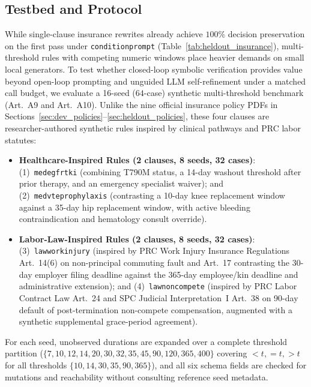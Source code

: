 \documentclass[10pt,twocolumn]{article}
\renewcommand{\_}{\textunderscore\allowbreak}
\begin{document}
\subsection{Testbed and Protocol}
While single-clause insurance rewrites already achieve $100\%$ decision preservation on the first pass under \texttt{condition\_prompt} (Table~\ref{tab:heldout_insurance}), multi-threshold rules with competing numeric windows place heavier demands on small local generators. To test whether closed-loop symbolic verification provides value beyond open-loop prompting and unguided LLM self-refinement under a matched call budget, we evaluate a 16-seed ($64$-case) synthetic multi-threshold benchmark (Art.~A9 and Art.~A10). Unlike the nine official insurance policy PDFs in Sections~\ref{sec:dev_policies}--\ref{sec:heldout_policies}, these four clauses are researcher-authored synthetic rules inspired by clinical pathways and PRC labor statutes:
\begin{itemize}[leftmargin=*,nosep]
  \item \textbf{Healthcare-Inspired Rules (2 clauses, 8 seeds, 32 cases)}: (1)~\texttt{med\_egfr\_tki} (combining T790M status, a 14-day washout threshold after prior therapy, and an emergency specialist waiver); and (2)~\texttt{med\_vte\_prophylaxis} (contrasting a 10-day knee replacement window against a 35-day hip replacement window, with active bleeding contraindication and hematology consult override).
  \item \textbf{Labor-Law-Inspired Rules (2 clauses, 8 seeds, 32 cases)}: (3)~\texttt{law\_work\_injury} (inspired by PRC Work Injury Insurance Regulations Art.~14(6) on non-principal commuting fault and Art.~17 contrasting the 30-day employer filing deadline against the 365-day employee/kin deadline and administrative extension); and (4)~\texttt{law\_noncompete} (inspired by PRC Labor Contract Law Art.~24 and SPC Judicial Interpretation~I Art.~38 on 90-day default of post-termination non-compete compensation, augmented with a synthetic supplemental grace-period agreement).
\end{itemize}

For each seed, unobserved durations are expanded over a complete threshold partition ($\{7, 10, 12, 14, 20, 30, 32, 35, 45, 90, 120, 365, 400\}$ covering $< t, = t, > t$ for all thresholds $\{10, 14, 30, 35, 90, 365\}$), and all six schema fields are checked for mutations and reachability without consulting reference seed metadata.
\end{document}
